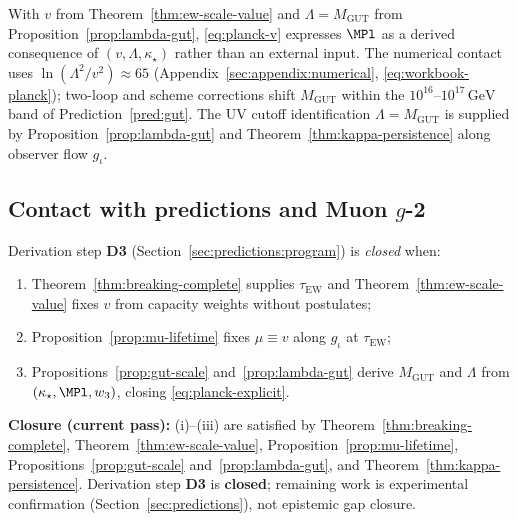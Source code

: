 \begin{remark}
With $v$ from Theorem~\ref{thm:ew-scale-value} and
$\Lambda=M_{\mathrm{GUT}}$ from Proposition~\ref{prop:lambda-gut},
\eqref{eq:planck-v} expresses $\MPl$ as a derived consequence of
$(v,\Lambda,\kappa_\star)$ rather than an external input. The numerical
contact uses $\ln(\Lambda^2/v^2)\approx 65$ (Appendix~\ref{sec:appendix:numerical},
\eqref{eq:workbook-planck}); two-loop and scheme corrections shift
$M_{\mathrm{GUT}}$ within the $10^{16}$--$10^{17}\,\mathrm{GeV}$ band of
Prediction~\ref{pred:gut}. The UV cutoff identification $\Lambda=M_{\mathrm{GUT}}$ is supplied by
Proposition~\ref{prop:lambda-gut} and Theorem~\ref{thm:kappa-persistence}
along observer flow $g_\iota$.
\end{remark}

\subsection{Contact with predictions and Muon $g$-2}
\label{sec:scales:contact}

\begin{proposition}
\label{prop:d3-closure}
Derivation step \textbf{D3} (Section~\ref{sec:predictions:program}) is
\emph{closed} when:
\begin{enumerate}[label=(\roman*),leftmargin=*]
  \item Theorem~\ref{thm:breaking-complete} supplies
    $\tau_{\mathrm{EW}}$ and Theorem~\ref{thm:ew-scale-value} fixes $v$
    from capacity weights without postulates;
  \item Proposition~\ref{prop:mu-lifetime} fixes $\mu\equiv v$ along
    $g_\iota$ at $\tau_{\mathrm{EW}}$;
  \item Propositions~\ref{prop:gut-scale} and~\ref{prop:lambda-gut} derive
    $M_{\mathrm{GUT}}$ and $\Lambda$ from $(\kappa_\star,\MPl,w_3)$, closing
    \eqref{eq:planck-explicit}.
\end{enumerate}
\textbf{Closure (current pass):} (i)--(iii) are satisfied by
Theorem~\ref{thm:breaking-complete}, Theorem~\ref{thm:ew-scale-value},
Proposition~\ref{prop:mu-lifetime}, Propositions~\ref{prop:gut-scale}
and~\ref{prop:lambda-gut}, and Theorem~\ref{thm:kappa-persistence}.
Derivation step \textbf{D3} is \textbf{closed}; remaining work is experimental
confirmation (Section~\ref{sec:predictions}), not epistemic gap closure.
\end{proposition}

